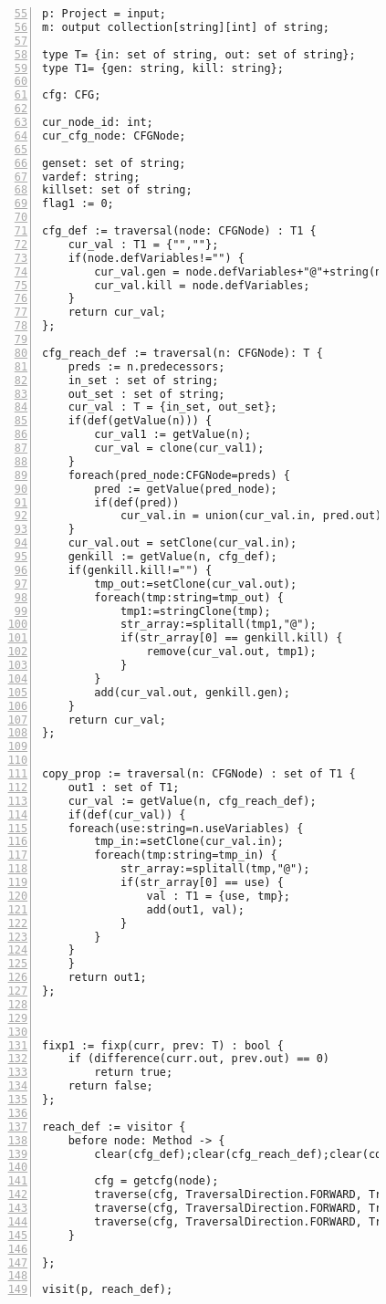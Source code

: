 \begin{figure}[ht!]
\begin{lstlisting}[numbers=left, tabsize=4, caption={Copy propagation},label={lst:cp-code},firstline=55, firstnumber=55] 
p: Project = input;
m: output collection[string][int] of string;

type T= {in: set of string, out: set of string};
type T1= {gen: string, kill: string};

cfg: CFG;

cur_node_id: int;
cur_cfg_node: CFGNode;

genset: set of string;
vardef: string;
killset: set of string;
flag1 := 0;

cfg_def := traversal(node: CFGNode) : T1 {
	cur_val : T1 = {"",""};
	if(node.defVariables!="") {
		cur_val.gen = node.defVariables+"@"+string(node.id);
		cur_val.kill = node.defVariables;
	}
	return cur_val;
};

cfg_reach_def := traversal(n: CFGNode): T {
	preds := n.predecessors;
	in_set : set of string;
	out_set : set of string;
	cur_val : T = {in_set, out_set};
	if(def(getValue(n))) {
		cur_val1 := getValue(n);
		cur_val = clone(cur_val1);
	}
	foreach(pred_node:CFGNode=preds) {	
		pred := getValue(pred_node);
		if(def(pred))
			cur_val.in = union(cur_val.in, pred.out);
	}
	cur_val.out = setClone(cur_val.in);
	genkill := getValue(n, cfg_def);
	if(genkill.kill!="") {
		tmp_out:=setClone(cur_val.out);
		foreach(tmp:string=tmp_out) {
			tmp1:=stringClone(tmp);
			str_array:=splitall(tmp1,"@");
			if(str_array[0] == genkill.kill) {
				remove(cur_val.out, tmp1);
			}
		}
		add(cur_val.out, genkill.gen);
	}
	return cur_val;
};


copy_prop := traversal(n: CFGNode) : set of T1 {
	out1 : set of T1;
	cur_val := getValue(n, cfg_reach_def);
	if(def(cur_val)) {
	foreach(use:string=n.useVariables) {
		tmp_in:=setClone(cur_val.in);
		foreach(tmp:string=tmp_in) {
			str_array:=splitall(tmp,"@");
			if(str_array[0] == use) {
				val : T1 = {use, tmp};
				add(out1, val);
			}
		}
	}
	}
	return out1;
};



fixp1 := fixp(curr, prev: T) : bool {
	if (difference(curr.out, prev.out) == 0)
		return true;	
	return false;
};

reach_def := visitor {
	before node: Method -> {
		clear(cfg_def);clear(cfg_reach_def);clear(copy_prop);

		cfg = getcfg(node);
		traverse(cfg, TraversalDirection.FORWARD, TraversalKind.HYBRID, cfg_def);
		traverse(cfg, TraversalDirection.FORWARD, TraversalKind.HYBRID, cfg_reach_def, fixp1);
		traverse(cfg, TraversalDirection.FORWARD, TraversalKind.HYBRID, copy_prop);
	}

};

visit(p, reach_def);
\end{lstlisting}
\end{figure}